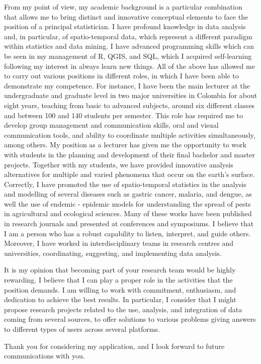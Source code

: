\documentclass[11pt, a4paper]{awesome-cv}
\begin{document}
\begin{cvletter}
From my point of view, my academic background is a particular combination that allows me to bring distinct and innovative conceptual elements to face the position of a principal statistician. I have profound knowledge in data analysis and, in particular, of spatio-temporal data, which represent a different paradigm within statistics and data mining. I have advanced programming skills which can be seen in my management of R, QGIS, and SQL, which I acquired self-learning following my interest in always learn new things. All of the above has allowed me to carry out various positions in different roles, in which I have been able to demonstrate my competence. For instance, I have been the main lecturer at the undergraduate and graduate level in two major universities in Colombia for about eight years, teaching from basic to advanced subjects, around six different classes and between 100 and 140 students per semester. This role has required me to develop group management and communication skills, oral and visual communication tools, and ability to coordinate multiple activities simultaneously, among others. My position as a lecturer has given me the opportunity to work with students in the planning and development of their final bachelor and master projects. Together with my students, we have provided innovative analysis alternatives for multiple and varied phenomena that occur on the earth's surface. Correctly, I have promoted the use of spatio-temporal statistics in the analysis and modelling of several diseases such as gastric cancer, malaria, and dengue, as well the use of endemic - epidemic models for understanding the spread of pests in agricultural and ecological sciences. Many of these works have been published in research journals and presented at conferences and symposiums. I believe that I am a person who has a robust capability to listen, interpret, and guide others. Moreover, I have worked in interdisciplinary teams in research centres and universities, coordinating, suggesting, and implementing data analysis. \par
It is my opinion that becoming part of your research team would be highly rewarding. I believe that I can play a proper role in the activities that the position demands. I am willing to work with commitment, enthusiasm, and dedication to achieve the best results. In particular, I consider that I might propose research projects related to the use, analysis, and integration of data coming from several sources, to offer solutions to various problems giving answers to different types of users across several platforms.\par\bigskip

Thank you for considering my application, and I look forward to future communications with you.
\end{cvletter}


\makeletterclosing
\end{document}
